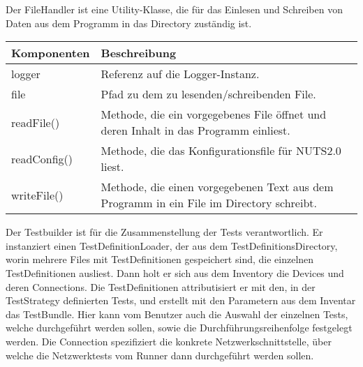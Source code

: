 \documentclass[]{subfiles}
\begin{document}
	Der FileHandler ist eine Utility-Klasse, die für das Einlesen und Schreiben von Daten aus dem Programm in das Directory zuständig ist.
	
	\begin{tabularx}{\textwidth}{lX}
		\toprule
			Komponenten & Beschreibung \\
		\midrule
			logger & Referenz auf die Logger-Instanz. \\
			file & Pfad zu dem zu lesenden/schreibenden File. \\
		\midrule
			readFile() & Methode, die ein vorgegebenes File öffnet und deren Inhalt in das Programm einliest. \\
			readConfig() & Methode, die das Konfigurationsfile für NUTS2.0 liest. \\
			writeFile() & Methode, die einen vorgegebenen Text aus dem Programm in ein File im Directory schreibt. \\
		\bottomrule
	\end{tabularx}

	Der Testbuilder ist für die Zusammenstellung der Tests verantwortlich. 
	Er instanziert einen TestDefinitionLoader, der aus dem TestDefinitionsDirectory, worin mehrere Files mit TestDefinitionen gespeichert sind, die einzelnen TestDefinitionen ausliest.
	Dann holt er sich aus dem Inventory die Devices und deren Connections. 
	Die TestDefinitionen attributisiert er mit den, in der TestStrategy definierten Tests, und erstellt mit den Parametern aus dem Inventar das TestBundle. 
	Hier kann vom Benutzer auch die Auswahl der einzelnen Tests, welche durchgeführt werden sollen, sowie die Durchführungsreihenfolge festgelegt werden.
	Die Connection spezifiziert die konkrete Netzwerkschnittstelle, über welche die Netzwerktests vom Runner dann durchgeführt werden sollen.
\end{document}
